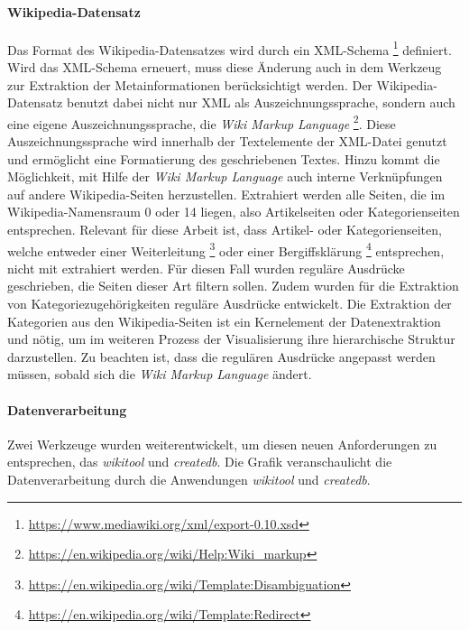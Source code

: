 \paragraph{Wikipedia-Datensatz}
Das Format des Wikipedia-Datensatzes wird durch ein XML-Schema \footnote{\url{https://www.mediawiki.org/xml/export-0.10.xsd}} definiert.
Wird das XML-Schema erneuert, muss diese Änderung auch in dem Werkzeug zur Extraktion der Metainformationen berücksichtigt werden.
Der Wikipedia-Datensatz benutzt dabei nicht nur XML als Auszeichnungssprache, sondern auch eine eigene Auszeichnungssprache, die \emph{Wiki Markup Language} \footnote{\url{https://en.wikipedia.org/wiki/Help:Wiki\_markup}}. 
Diese Auszeichnungssprache wird innerhalb der Textelemente der XML-Datei genutzt und ermöglicht eine Formatierung des geschriebenen Textes.
Hinzu kommt die Möglichkeit, mit Hilfe der \emph{Wiki Markup Language} auch interne Verknüpfungen auf andere Wikipedia-Seiten herzustellen.
Extrahiert werden alle Seiten, die im Wikipedia-Namensraum 0 oder 14 liegen, also Artikelseiten oder Kategorienseiten entsprechen.
Relevant für diese Arbeit ist, dass Artikel- oder Kategorienseiten, welche entweder einer Weiterleitung \footnote{\url{https://en.wikipedia.org/wiki/Template:Disambiguation}} oder einer Bergiffsklärung \footnote{\url{https://en.wikipedia.org/wiki/Template:Redirect}} entsprechen, nicht mit extrahiert werden.
Für diesen Fall wurden reguläre Ausdrücke geschrieben, die Seiten dieser Art filtern sollen.
Zudem wurden für die Extraktion von Kategoriezugehörigkeiten reguläre Ausdrücke entwickelt.
Die Extraktion der Kategorien aus den Wikipedia-Seiten ist ein Kernelement der Datenextraktion und nötig, um im weiteren Prozess der Visualisierung ihre hierarchische Struktur darzustellen.
Zu beachten ist, dass die regulären Ausdrücke angepasst werden müssen, sobald sich die \emph{Wiki Markup Language} ändert.

\paragraph{Datenverarbeitung} \label{subchap:datenverarbeitung}
Zwei Werkzeuge wurden weiterentwickelt, um diesen neuen Anforderungen zu entsprechen, das \emph{wikitool} und \emph{createdb}.
Die Grafik  veranschaulicht die Datenverarbeitung durch die Anwendungen \emph{wikitool} und \emph{createdb}.

